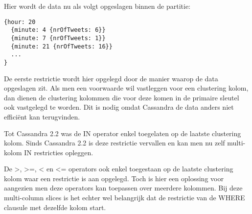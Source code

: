 Hier wordt de data nu als volgt opgeslagen binnen de partitie: 

\begin{lstlisting}
{hour: 20 
  {minute: 4 {nrOfTweets: 6}} 
  {minute: 7 {nrOfTweets: 1}}
  {minute: 21 {nrOfTweets: 16}}
  ...
}
\end{lstlisting}

De eerste restrictie wordt hier opgelegd door de manier waarop de data opgeslagen zit.
Als men een voorwaarde wil vastleggen voor een clustering kolom, dan dienen de clustering kolommen die voor deze komen in de primaire sleutel ook vastgelegd te worden.
Dit is nodig omdat Cassandra de data anders niet efficiënt kan terugvinden.

Tot Cassandra 2.2 was de IN operator enkel toegelaten op de laatste clustering kolom.
Sinds Cassandra 2.2 is deze restrictie vervallen en kan men nu zelf multi-kolom IN restricties opleggen.

De >, >=, < en <= operators ook enkel toegestaan op de laatste clustering kolom waar een restrictie is aan opgelegd.
Toch is hier een oplossing voor aangezien men deze operators kan toepassen over meerdere kolommen.
Bij deze multi-column slices is het echter wel belangrijk dat de restrictie van de WHERE clausule met dezelfde kolom start.